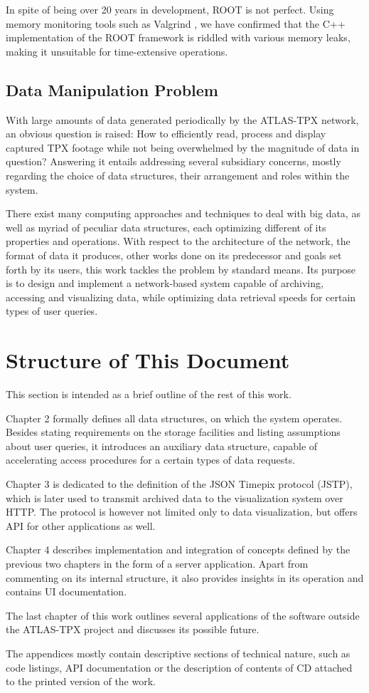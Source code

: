 In spite of being over 20 years in development, ROOT is not perfect. Using memory monitoring tools such as Valgrind \cite{Valgrind}, we have confirmed that the C++ implementation of the ROOT framework is riddled with various memory leaks, making it unsuitable for time-extensive operations.

\subsection{Data Manipulation Problem}
With large amounts of data generated periodically by the ATLAS-TPX network, an obvious question is raised: How to efficiently read, process and display captured TPX footage while not being overwhelmed by the magnitude of data in question? Answering it entails addressing several subsidiary concerns, mostly regarding the choice of data structures, their arrangement and roles within the system.

There exist many computing approaches and techniques to deal with big data, as well as myriad of peculiar data structures, each optimizing different of its properties and operations. With respect to the architecture of the network, the format of data it produces, other works done on its predecessor and goals set forth by its users, this work tackles the problem by standard means. Its purpose is to design and implement a network-based system capable of archiving, accessing and visualizing data, while optimizing data retrieval speeds for certain types of user queries.

\section{Structure of This Document}
This section is intended as a brief outline of the rest of this work.

Chapter 2 formally defines all data structures, on which the system operates. Besides stating requirements on the storage facilities and listing assumptions about user queries, it introduces an auxiliary data structure, capable of accelerating access procedures for a certain types of data requests.

Chapter 3 is dedicated to the definition of the JSON Timepix protocol (JSTP), which is later used to transmit archived data to the visualization system over HTTP. The protocol is however not limited only to data visualization, but offers API for other applications as well.

Chapter 4 describes implementation and integration of concepts defined by the previous two chapters in the form of a server application. Apart from commenting on its internal structure, it also provides insights in its operation and contains UI documentation.

The last chapter of this work outlines several applications of the software outside the ATLAS-TPX project and discusses its possible future.

The appendices mostly contain descriptive sections of technical nature, such as code listings, API documentation or the description of contents of CD attached to the printed version of the work.
